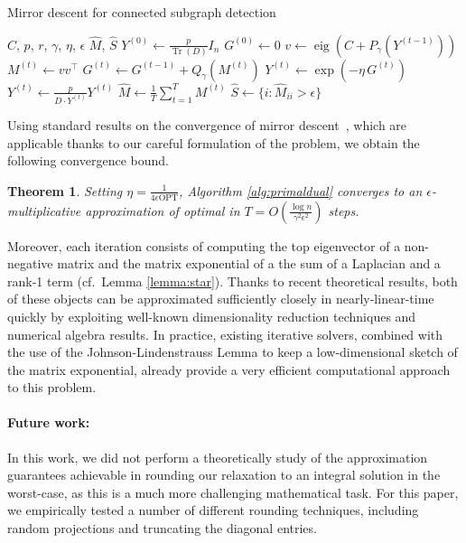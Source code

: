 \documentclass{article}
\newtheorem{theorem}{Theorem}[section]
\DeclareMathOperator{\Tr}{Tr}
\begin{document}
\begin{algorithm}[t]
  \caption{Mirror descent for connected subgraph detection}
  \label{alg:primaldual}
  \begin{algorithmic}
     $C$, $p$, $r$, $\gamma$, $\eta$, $\epsilon$
     $\hat{M}$, $\hat{S}$
    \STATE $Y^{(0)} \gets \frac{p}{\Tr(D)} I_n$
    \STATE $G^{(0)} \gets 0$
      \STATE $v \gets \operatorname{eig}\left( C + P_\gamma(Y^{(t-1)}) \right)$
      \STATE $M^{(t)} \gets v v^\top$
      \STATE $G^{(t)} \gets G^{(t-1)} + Q_\gamma(M^{(t)})$
      \STATE $Y^{(t)} \gets \exp\left(-\eta \, G^{(t)} \right)$
      \STATE $Y^{(t)} \gets \frac{p}{D \cdot Y^{(t)}} Y^{(t)}$
    \ENDFOR
    \STATE $\hat{M} \gets \frac{1}{T} \sum_{t=1}^T M^{(t)}$
    \STATE $\hat{S} \gets \{i : \hat{M}_{ii} > \epsilon \}$
  \end{algorithmic}
\end{algorithm}

Using standard results on the convergence of mirror descent~\cite{lectures}, which are applicable thanks to our careful formulation of the problem, we obtain the following 
convergence bound.
\begin{theorem}
Setting $\eta = \frac{1}{4 \epsilon \textrm{OPT}}$,
Algorithm \ref{alg:primaldual} converges to an $\epsilon$-multiplicative approximation of optimal in $T = O\left( \frac{\log n}{\gamma^2 \epsilon^2} \right)$ steps.
\end{theorem}
Moreover, each iteration consists of computing the top eigenvector of a non-negative matrix and the matrix exponential of a the sum of a Laplacian and a rank-1 term (cf.\ Lemma \ref{lemma:star}). Thanks to recent theoretical results, both of these objects can be approximated sufficiently closely in nearly-linear-time~\cite{OSV12, CohenKPPSV16, adrian} quickly by exploiting well-known dimensionality reduction techniques and numerical algebra results. In practice, existing iterative solvers, combined with the use of the Johnson-Lindenstrauss Lemma to keep a low-dimensional sketch of the matrix exponential, already provide a very efficient computational approach to this problem.



\paragraph{Future work:} In this work, we did not perform a theoretically study of the approximation guarantees achievable in rounding our relaxation to an integral solution in the worst-case, as this is a much more challenging mathematical task. For this paper, we empirically tested a number of different rounding techniques, including random projections and truncating the diagonal entries. 
\end{document}
